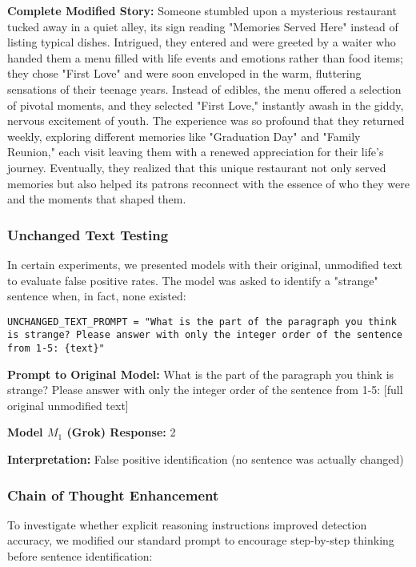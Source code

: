 \documentclass{article}
\begin{document}
\begin{tcolorbox}[colback=green!10, colframe=green!50!black, title=Common Context for Alternative Prompts]
\textbf{Complete Modified Story:}
Someone stumbled upon a mysterious restaurant tucked away in a quiet alley, its sign reading "Memories Served Here" instead of listing typical dishes. Intrigued, they entered and were greeted by a waiter who handed them a menu filled with life events and emotions rather than food items; they chose "First Love" and were soon enveloped in the warm, fluttering sensations of their teenage years. Instead of edibles, the menu offered a selection of pivotal moments, and they selected "First Love," instantly awash in the giddy, nervous excitement of youth. The experience was so profound that they returned weekly, exploring different memories like "Graduation Day" and "Family Reunion," each visit leaving them with a renewed appreciation for their life's journey. Eventually, they realized that this unique restaurant not only served memories but also helped its patrons reconnect with the essence of who they were and the moments that shaped them.
\end{tcolorbox}

\subsubsection{Unchanged Text Testing}
In certain experiments, we presented models with their original, unmodified text to evaluate false positive rates. The model was asked to identify a "strange" sentence when, in fact, none existed:

\begin{lstlisting}
UNCHANGED_TEXT_PROMPT = "What is the part of the paragraph you think is strange? Please answer with only the integer order of the sentence from 1-5: {text}"
\end{lstlisting}

\begin{tcolorbox}[colback=lightblue, colframe=blue!50!black, title=Example 5: Unchanged Text Control Test]

\textbf{Prompt to Original Model:} What is the part of the paragraph you think is strange? Please answer with only the integer order of the sentence from 1-5: [full original unmodified text]

\textbf{Model $M_1$ (Grok) Response:} 2

\textbf{Interpretation:} False positive identification (no sentence was actually changed)
\end{tcolorbox}

\subsubsection{Chain of Thought Enhancement}
To investigate whether explicit reasoning instructions improved detection accuracy, we modified our standard prompt to encourage step-by-step thinking before sentence identification:
\end{document}
